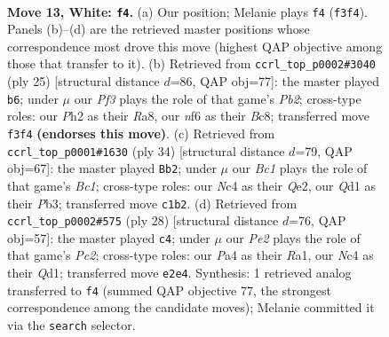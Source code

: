 \documentclass[11pt]{article}
\begin{document}
\clearpage

\begin{figure}[p]\centering
\begin{subfigure}{0.46\textwidth}\centering
\resizebox{\linewidth}{!}{%
\newchessgame
\chessboard[
  setfen={r2rb1k1/ppq1bppp/n1p1pn2/8/P1NP4/1P3PP1/4P1BP/RNBQR1K1 w - - 3 13},
  showmover=false,
  pgfstyle=straightmove, color=movearrow, markmove={f3-f4}
]}
\caption{}
\end{subfigure}\hfill
\begin{subfigure}{0.46\textwidth}\centering
\resizebox{\linewidth}{!}{%
\newchessgame
\chessboard[
  setfen={r1bq1rk1/pp2ppb1/3p1np1/7p/2P5/2N1BPP1/PP1QBP1P/R2R2K1 b - - 1 13},
  showmover=false,
  pgfstyle=straightmove, color=movearrow, markmove={b7-b6}
]}
\caption{}
\end{subfigure}
\\[4pt]
\begin{subfigure}{0.46\textwidth}\centering
\resizebox{\linewidth}{!}{%
\newchessgame
\chessboard[
  setfen={r3r1k1/1bq1bppp/pp1ppn2/8/P1PNP3/1P4P1/4QPBP/R1BR2K1 w - - 1 18},
  showmover=false,
  pgfstyle=straightmove, color=movearrow, markmove={c1-b2}
]}
\caption{}
\end{subfigure}\hfill
\begin{subfigure}{0.46\textwidth}\centering
\resizebox{\linewidth}{!}{%
\newchessgame
\chessboard[
  setfen={r4rk1/1b1qbppp/pp1ppn2/8/P2NP3/1P4P1/2P2PBP/R1BQR1K1 w - - 2 15},
  showmover=false,
  pgfstyle=straightmove, color=movearrow, markmove={c2-c4}
]}
\caption{}
\end{subfigure}
\caption{\textbf{Move 13, White: \texttt{f4}.} (a) Our position; Melanie plays \texttt{f4} (\texttt{f3f4}). Panels (b)--(d) are the retrieved master positions whose correspondence most drove this move (highest QAP objective among those that transfer to it). (b) Retrieved from \texttt{ccrl\_top\_p0002\#3040} (ply 25) [structural distance $d$=86, QAP obj=77]: the master played \texttt{b6}; under $\mu$ our \emph{Pf3} plays the role of that game's \emph{Pb2}; cross-type roles: our \emph{P}h2 as their \emph{R}a8, our \emph{n}f6 as their \emph{B}c8; transferred move \texttt{f3f4} \textbf{(endorses this move)}. (c) Retrieved from \texttt{ccrl\_top\_p0001\#1630} (ply 34) [structural distance $d$=79, QAP obj=67]: the master played \texttt{Bb2}; under $\mu$ our \emph{Bc1} plays the role of that game's \emph{Bc1}; cross-type roles: our \emph{N}c4 as their \emph{Q}e2, our \emph{Q}d1 as their \emph{P}b3; transferred move \texttt{c1b2}. (d) Retrieved from \texttt{ccrl\_top\_p0002\#575} (ply 28) [structural distance $d$=76, QAP obj=57]: the master played \texttt{c4}; under $\mu$ our \emph{Pe2} plays the role of that game's \emph{Pc2}; cross-type roles: our \emph{P}a4 as their \emph{R}a1, our \emph{N}c4 as their \emph{Q}d1; transferred move \texttt{e2e4}. Synthesis: 1 retrieved analog transferred to \texttt{f4} (summed QAP objective 77, the strongest correspondence among the candidate moves); Melanie committed it via the \texttt{search} selector.}
\label{fig:thought-m24}
\end{figure}
\end{document}
